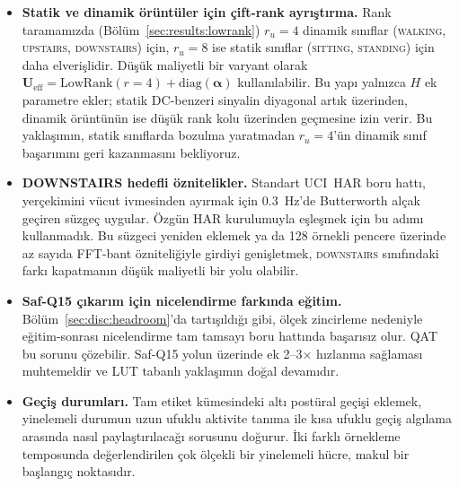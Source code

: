 \begin{itemize}
\item \textbf{Statik ve dinamik örüntüler için çift-rank ayrıştırma.}
Rank taramamızda (Bölüm~\ref{sec:results:lowrank}) $r_u{=}4$ dinamik
sınıflar (\textsc{walking}, \textsc{upstairs}, \textsc{downstairs})
için, $r_u{=}8$ ise statik sınıflar (\textsc{sitting},
\textsc{standing}) için daha elverişlidir. Düşük maliyetli bir
varyant olarak
$\mathbf{U}_\text{eff} = \mathrm{LowRank}(r{=}4) + \mathrm{diag}(\boldsymbol{\alpha})$
kullanılabilir. Bu yapı yalnızca $H$ ek parametre ekler; statik
DC-benzeri sinyalin diyagonal artık üzerinden, dinamik örüntünün ise
düşük rank kolu üzerinden geçmesine izin verir. Bu yaklaşımın,
statik sınıflarda bozulma yaratmadan $r_u{=}4$'ün dinamik sınıf
başarımını geri kazanmasını bekliyoruz.

\item \textbf{DOWNSTAIRS hedefli öznitelikler.} Standart UCI~HAR
boru hattı, yerçekimini vücut ivmesinden ayırmak için 0.3~Hz'de
Butterworth alçak geçiren süzgeç uygular. Özgün \fastgrnn{} HAR
kurulumuyla eşleşmek için bu adımı kullanmadık. Bu süzgeci yeniden
eklemek ya da 128 örnekli pencere üzerinde az sayıda FFT-bant
özniteliğiyle girdiyi genişletmek, \textsc{downstairs} sınıfındaki
farkı kapatmanın düşük maliyetli bir yolu olabilir.

\item \textbf{Saf-Q15 çıkarım için nicelendirme farkında eğitim.}
Bölüm~\ref{sec:disc:headroom}'da tartışıldığı gibi, ölçek
zincirleme nedeniyle eğitim-sonrası nicelendirme tam tamsayı boru
hattında başarısız olur. QAT~\cite{hubara2017qnn} bu sorunu
çözebilir. Saf-Q15 yolun \msp{} üzerinde ek 2--3$\times$ hızlanma
sağlaması muhtemeldir ve LUT tabanlı yaklaşımın doğal devamıdır.

\item \textbf{Geçiş durumları.} Tam \hapt{} etiket kümesindeki altı
postüral geçişi eklemek, yinelemeli durumun uzun ufuklu aktivite
tanıma ile kısa ufuklu geçiş algılama arasında nasıl paylaştırılacağı
sorusunu doğurur. İki farklı örnekleme temposunda değerlendirilen
çok ölçekli bir yinelemeli hücre, makul bir başlangıç noktasıdır.

\end{itemize}
